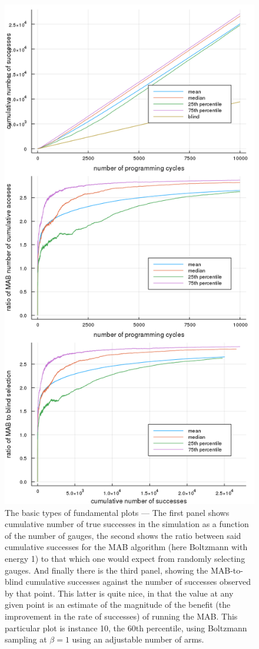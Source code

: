 \begin{figure}
    \includegraphics[width=0.7\columnwidth]{boltzmann_inst10_air.png}
    \caption{The basic types of fundamental plots --- The first panel shows cumulative number of true successes in the simulation as a function of the number of gauges, the second shows the ratio between said cumulative successes for the MAB algorithm (here Boltzmann with energy 1) to that which one would expect from randomly selecting gauges. And finally there is the third panel, showing the MAB-to-blind cumulative successes against the number of successes observed by that point. This latter is quite nice, in that the value at any given point is an estimate of the magnitude of the benefit (the improvement in the rate of successes) of running the MAB. This particular plot is instance 10, the 60th percentile, using Boltzmann sampling at $\beta=1$ using an adjustable number of arms.}
    \label{fig:boltzmann_inst10_air}
\end{figure}

